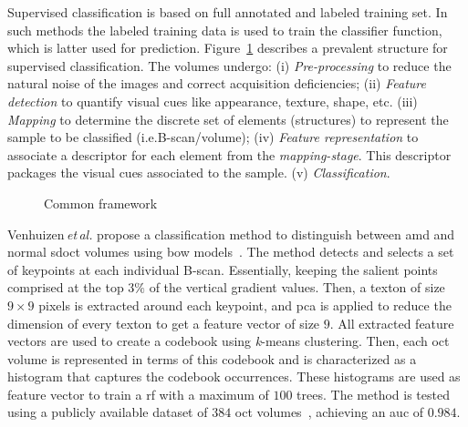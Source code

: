 Supervised classification is based on full annotated and labeled training set.
In such methods the labeled training data is used to train the classifier function, which is latter used for prediction.
%
Figure~\ref{fig:ML-scheme} describes a prevalent structure for supervised classification.
The volumes undergo:
(i) \emph{Pre-processing} to reduce the natural noise of the images and correct acquisition deficiencies;
(ii) \emph{Feature detection} to quantify visual cues like appearance, texture, shape, etc.
(iii) \emph{Mapping} to determine the discrete set of elements (structures) to represent the sample to be classified (i.e.B-scan/volume);
(iv) \emph{Feature representation} to associate a descriptor for each element from the \emph{mapping-stage}.
This descriptor packages the visual cues associated to the sample.
(v) \emph{Classification}.


\begin{figure}
  \caption{Common framework}
  \label{fig:ML-scheme}
\end{figure}

%
Venhuizen\,\textit{et\,al.} propose a classification method to distinguish between \gls{amd} and normal \gls{sdoct} volumes using \gls{bow} models~\cite{Venhuizen2015}.
%
The method detects and selects a set of keypoints at each individual B-scan.
Essentially, keeping the salient points comprised at the top $3\%$ of the vertical gradient values.
Then, a texton of size $9 \times 9$ pixels is extracted around each keypoint, and \gls{pca} is applied to reduce the dimension of every texton to get a feature vector of size $9$.
All extracted feature vectors are used to create a codebook using \textit{k}-means clustering.
Then, each \gls{oct} volume is represented in terms of this codebook and is characterized as a histogram that captures the codebook occurrences.
These histograms are used as feature vector to train a \gls{rf} with a maximum of $100$ trees.
%
The method is tested using a publicly available dataset of $384$ \gls{oct} volumes~\cite{farsiu2014quantitative}, achieving an \gls{auc} of $0.984$.


